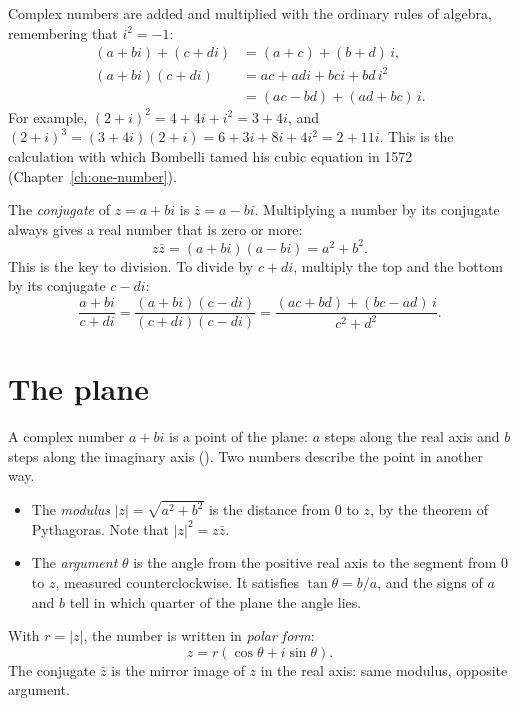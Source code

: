 Complex numbers are added and multiplied with the ordinary rules of algebra, remembering that $i^2 = -1$:
\begin{align*}
(a + bi) + (c + di) &= (a + c) + (b + d)\,i, \\
(a + bi)(c + di) &= ac + adi + bci + bd\,i^2 \\
&= (ac - bd) + (ad + bc)\,i .
\end{align*}
For example, $(2 + i)^2 = 4 + 4i + i^2 = 3 + 4i$, and $(2 + i)^3 = (3 + 4i)(2 + i) = 6 + 3i + 8i + 4i^2 = 2 + 11i$. This is the calculation with which Bombelli tamed his cubic equation in 1572 (Chapter~\ref{ch:one-number}).

The \emph{conjugate} of $z = a + bi$ is $\bar{z} = a - bi$. Multiplying a number by its conjugate always gives a real number that is zero or more:
\[
z\bar{z} = (a + bi)(a - bi) = a^2 + b^2 .
\]
This is the key to division. To divide by $c + di$, multiply the top and the bottom by its conjugate $c - di$:
\[
\frac{a + bi}{c + di} = \frac{(a + bi)(c - di)}{(c + di)(c - di)} = \frac{(ac + bd) + (bc - ad)\,i}{c^2 + d^2} .
\]

\section{The plane}\label{app:c-plane}

A complex number $a + bi$ is a point of the plane: $a$ steps along the real axis and $b$ steps along the imaginary axis (). Two numbers describe the point in another way.
\begin{itemize}
  \item The \emph{modulus} $|z| = \sqrt{a^2 + b^2}$ is the distance from $0$ to $z$, by the theorem of Pythagoras. Note that $|z|^2 = z\bar{z}$.
  \item The \emph{argument} $\theta$ is the angle from the positive real axis to the segment from $0$ to $z$, measured counterclockwise. It satisfies $\tan\theta = b/a$, and the signs of $a$ and $b$ tell in which quarter of the plane the angle lies.
\end{itemize}
With $r = |z|$, the number is written in \emph{polar form}:
\[
z = r(\cos\theta + i\sin\theta) .
\]
The conjugate $\bar{z}$ is the mirror image of $z$ in the real axis: same modulus, opposite argument.

